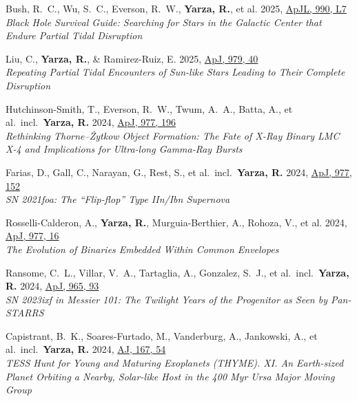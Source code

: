 \item Bush, R.~C., Wu, S.~C., Everson, R.~W., \textbf{Yarza, R.}, et al. 2025, \href{https://ui.adsabs.harvard.edu/abs/2025ApJ...990L...7B}{ApJL, 990, L7}\\\textit{Black Hole Survival Guide: Searching for Stars in the Galactic Center that Endure Partial Tidal Disruption}

\item Liu, C., \textbf{Yarza, R.}, \& Ramirez-Ruiz, E. 2025, \href{https://ui.adsabs.harvard.edu/abs/2025ApJ...979...40L}{ApJ, 979, 40}\\\textit{Repeating Partial Tidal Encounters of Sun-like Stars Leading to Their Complete Disruption}

\item Hutchinson-Smith, T., Everson, R.~W., Twum, A.~A., Batta, A., et al.\ incl.\ \textbf{Yarza, R.} 2024, \href{https://ui.adsabs.harvard.edu/abs/2024ApJ...977..196H}{ApJ, 977, 196}\\\textit{Rethinking Thorne–Żytkow Object Formation: The Fate of X-Ray Binary LMC X-4 and Implications for Ultra-long Gamma-Ray Bursts}

\item Farias, D., Gall, C., Narayan, G., Rest, S., et al.\ incl.\ \textbf{Yarza, R.} 2024, \href{https://ui.adsabs.harvard.edu/abs/2024ApJ...977..152F}{ApJ, 977, 152}\\\textit{SN 2021foa: The ``Flip-flop'' Type IIn/Ibn Supernova}

\item Rosselli-Calderon, A., \textbf{Yarza, R.}, Murguia-Berthier, A., Rohoza, V., et al. 2024, \href{https://ui.adsabs.harvard.edu/abs/2024ApJ...977...16R}{ApJ, 977, 16}\\\textit{The Evolution of Binaries Embedded Within Common Envelopes}

\item Ransome, C.~L., Villar, V.~A., Tartaglia, A., Gonzalez, S.~J., et al.\ incl.\ \textbf{Yarza, R.} 2024, \href{https://ui.adsabs.harvard.edu/abs/2024ApJ...965...93R}{ApJ, 965, 93}\\\textit{SN 2023ixf in Messier 101: The Twilight Years of the Progenitor as Seen by Pan-STARRS}

\item Capistrant, B.~K., Soares-Furtado, M., Vanderburg, A., Jankowski, A., et al.\ incl.\ \textbf{Yarza, R.} 2024, \href{https://ui.adsabs.harvard.edu/abs/2024AJ....167...54C}{AJ, 167, 54}\\\textit{TESS Hunt for Young and Maturing Exoplanets (THYME). XI\@. An Earth-sized Planet Orbiting a Nearby, Solar-like Host in the 400 Myr Ursa Major Moving Group}

